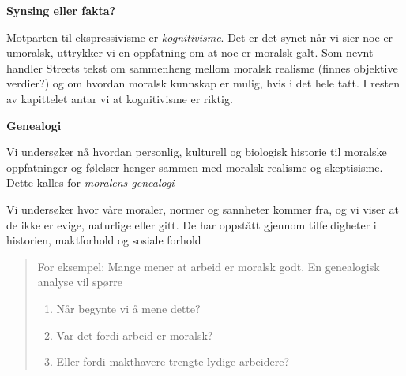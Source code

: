 \documentclass[11pt, a4paper]{article}
\newenvironment{sectionbox}[1][]{%
    \begin{sectionboxinner}
    \textbf{\large #1}
    \vspace{1pt}
    \newline
}{%
    \end{sectionboxinner}
}
\begin{document}
\begin{sectionbox}[Synsing eller fakta?]
\begin{flushleft}
    Motparten til ekspressivisme er \textit{kognitivisme}. Det er det synet når vi sier noe er umoralsk, uttrykker vi en oppfatning om at noe er moralsk galt. Som nevnt handler Streets tekst om sammenheng mellom moralsk realisme (finnes objektive verdier?) og om hvordan moralsk kunnskap er mulig, hvis i det hele tatt. I resten av kapittelet antar vi at kognitivisme er riktig.
\end{flushleft}
\end{sectionbox}

\begin{sectionbox}[Genealogi]
\begin{flushleft}
    Vi undersøker nå hvordan personlig, kulturell og biologisk historie til moralske oppfatninger og følelser henger sammen med moralsk realisme og skeptisisme. Dette kalles for \textit{moralens genealogi}\newline

    Vi undersøker hvor våre moraler, normer og sannheter kommer fra, og vi viser at de ikke er evige, naturlige eller gitt. De har oppstått gjennom tilfeldigheter i historien, maktforhold og sosiale forhold

    \begin{quote}
        For eksempel: Mange mener at arbeid er moralsk godt. En genealogisk analyse vil spørre 
        \begin{enumerate}
            \item Når begynte vi å mene dette?
            \item Var det fordi arbeid er moralsk?
            \item Eller fordi makthavere trengte lydige arbeidere?
        \end{enumerate}
    \end{quote}
\end{flushleft}
\end{sectionbox}
\end{document}

